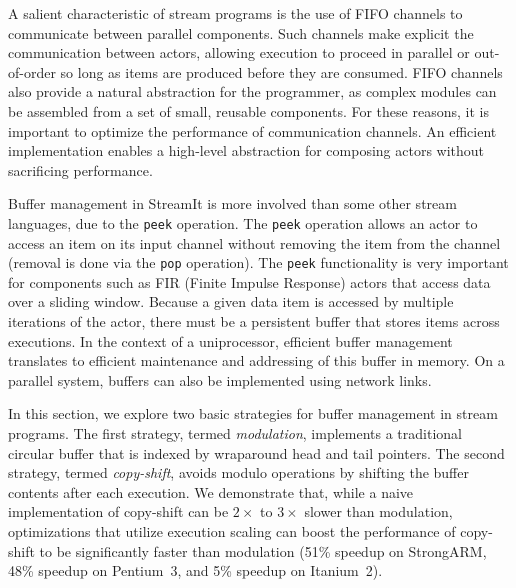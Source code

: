 \documentclass{sigplanconf}
\begin{document}
A salient characteristic of stream programs is the use of FIFO
channels to communicate between parallel components.  Such channels
make explicit the communication between actors, allowing execution to
proceed in parallel or out-of-order so long as items are produced
before they are consumed.  FIFO channels also provide a natural
abstraction for the programmer, as complex modules can be assembled
from a set of small, reusable components.  For these reasons, it is
important to optimize the performance of communication channels.  An
efficient implementation enables a high-level abstraction for
composing actors without sacrificing performance.

Buffer management in StreamIt is more involved than some other stream
languages, due to the {\tt peek} operation.  The {\tt peek} operation
allows an actor to access an item on its input channel without
removing the item from the channel (removal is done via the {\tt pop}
operation).  The {\tt peek} functionality is very important for
components such as FIR (Finite Impulse Response) actors that access
data over a sliding window.  Because a given data item is accessed by
multiple iterations of the actor, there must be a persistent buffer
that stores items across executions.  In the context of a
uniprocessor, efficient buffer management translates to efficient
maintenance and addressing of this buffer in memory.  On a parallel
system, buffers can also be implemented using network links.

In this section, we explore two basic strategies for buffer management
in stream programs.  The first strategy, termed {\it modulation},
implements a traditional circular buffer that is indexed by wraparound
head and tail pointers.  The second strategy, termed {\it copy-shift},
avoids modulo operations by shifting the buffer contents after each
execution.  We demonstrate that, while a naive implementation of
copy-shift can be $2\times$ to $3\times$ slower than modulation, optimizations that
utilize execution scaling can boost the performance of copy-shift to
be significantly faster than modulation (51\% speedup on StrongARM,
48\% speedup on Pentium~3, and 5\% speedup on Itanium~2).
\end{document}
